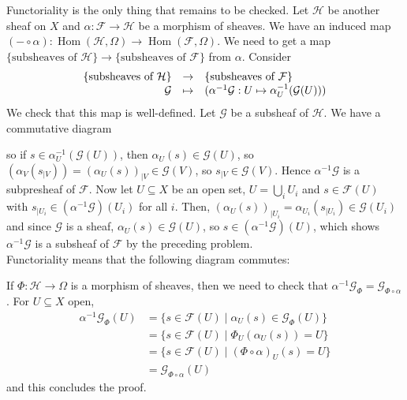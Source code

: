 \documentclass{article}
\newcommand{\F}{\mathcal{F}}
\newcommand{\G}{\mathcal{G}}
\DeclareMathOperator{\Sh}{Sh}
\DeclareMathOperator{\Hom}{Hom}
\newcommand{\applic}[4]{\begin{array}[t]{rcl}
#1 & \to & #2 \\
#3 & \mapsto & #4
\end{array}}
\begin{document}
\begin{enumerate}
    Functoriality is the only thing that remains to be checked. Let $\mathcal{H}$ be another sheaf on $X$ and $\alpha : \F \to \mathcal{H}$ be a morphism of sheaves. We have an induced map $(- \circ \alpha) : \Hom(\mathcal{H},\Omega) \to \Hom(\F,\Omega)$. We need to get a map $\{\text{subsheaves of $\mathcal{H}$}\} \to \{\text{subsheaves of $\F$}\}$ from $\alpha$. Consider
    \[\applic{\{\text{subsheaves of $\mathcal{H}$}\}}{\{\text{subsheaves of $\F$}\}}{\G}{(\alpha^{-1}\G : U\mapsto \alpha_U^{-1}(\G(U)))}\]
    We check that this map is well-defined. Let $\G$ be a subsheaf of $\mathcal{H}$. We have a commutative diagram
    \begin{center}
    \end{center}
    so if $s \in \alpha_U^{-1}(\G(U))$, then $\alpha_U(s) \in \G(U)$, so $(\alpha_V(s_{\mid V})) = (\alpha_U(s))_{\mid V} \in \G(V)$, so $s_{\mid V} \in \G(V)$. Hence $\alpha^{-1}\G$ is a subpresheaf of $\F$. Now let $U \subseteq X$ be an open set, $U = \bigcup_i U_i$ and $s \in \F(U)$ with $s_{\mid U_i} \in (\alpha^{-1}\G)(U_i)$ for all $i$. Then, $(\alpha_U(s))_{\mid U_i} = \alpha_{U_i}(s_{\mid U_i}) \in \G(U_i)$ and since $\G$ is a sheaf, $\alpha_U (s) \in \G(U)$, so $s \in (\alpha^{-1}\G)(U)$, which shows $\alpha^{-1}\G$ is a subsheaf of $\F$ by the preceding problem. \\
    Functoriality means that the following diagram commutes:
    \begin{center}
    \end{center}
    If $\Phi : \mathcal{H} \to \Omega$ is a morphism of sheaves, then we need to check that $\alpha^{-1}\G_\Phi = \G_{\Phi \circ \alpha}$. For $U \subseteq X$ open,
    \begin{align*}
        \alpha^{-1}\G_\Phi (U)
        & = \{s \in \F(U) \mid \alpha_U(s) \in \G_\Phi(U)\} \\
        & = \{s \in \F(U) \mid \Phi_U(\alpha_U(s)) = U\} \\
        & = \{s \in \F(U) \mid (\Phi \circ \alpha)_U(s) = U\} \\
        & = \G_{\Phi \circ \alpha} (U)
    \end{align*}
    and this concludes the proof.
\end{enumerate}
\end{document}

